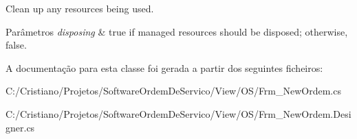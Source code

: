 Clean up any resources being used. 


\begin{DoxyParams}{Parâmetros}
{\em disposing} & true if managed resources should be disposed; otherwise, false.\\
\hline
\end{DoxyParams}


A documentação para esta classe foi gerada a partir dos seguintes ficheiros\+:\begin{DoxyCompactItemize}
\item 
C\+:/\+Cristiano/\+Projetos/\+Software\+Ordem\+De\+Servico/\+View/\+O\+S/Frm\+\_\+\+New\+Ordem.\+cs\item 
C\+:/\+Cristiano/\+Projetos/\+Software\+Ordem\+De\+Servico/\+View/\+O\+S/Frm\+\_\+\+New\+Ordem.\+Designer.\+cs\end{DoxyCompactItemize}
